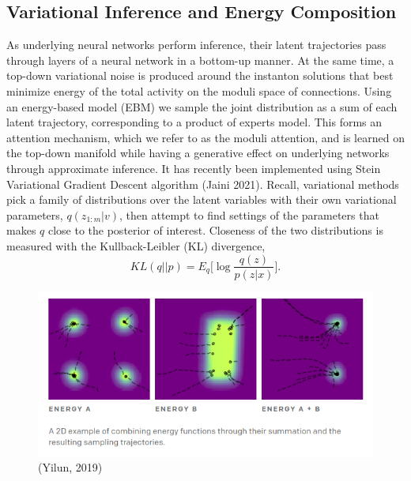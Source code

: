 \documentclass{article}
\begin{document}
\subsection{Variational Inference and Energy Composition}
    As underlying neural networks perform inference, their latent trajectories pass through layers of a neural network in a bottom-up manner. At the same time, a top-down variational noise is produced around the instanton solutions that best minimize energy of the total activity on the moduli space of connections. Using an energy-based model (EBM) we sample the joint distribution as a sum of each latent trajectory, corresponding to a product of experts model. This forms an attention mechanism, which we refer to as the moduli attention, and is learned on the top-down manifold while having a generative effect on underlying networks through approximate inference. It has recently been implemented using Stein Variational Gradient Descent algorithm (Jaini 2021). Recall, variational methods pick a family of distributions over the latent variables with their own variational parameters, $q(z_{1:m} | v)$, then attempt to find settings of the parameters that makes $q$ close to the posterior of interest. Closeness of the two distributions is measured with the Kullback-Leibler (KL) divergence, 
    \begin{equation}
         \displaystyle KL(q||p)=  E_q\bigg[ \log \frac{ q(z)}{p(z | x)} \bigg].
    \end{equation}
    \begin{figure}[H]
        \centering
        \includegraphics[width=13cm]{openai-ebm.png}
        \vspace{-0.87cm}
        \\  (Yilun, 2019)
    \end{figure}
\end{document}
